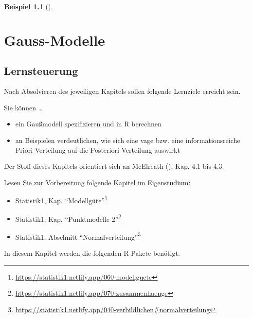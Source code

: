 \documentclass[
  ngerman,
  letterpaper,
  twoside,
  open=any]{scrbook}
\providecommand{\tightlist}{%
  \setlength{\itemsep}{0pt}\setlength{\parskip}{0pt}}\usepackage{longtable,booktabs,array}
\theoremstyle{definition}
\newtheorem{example}{Beispiel}[chapter]
\theoremstyle{plain}
\theoremstyle{definition}
\theoremstyle{definition}
\theoremstyle{remark}
\begin{document}
\begin{example}[]
\chapter{Gauss-Modelle}\label{gauss-modelle}

\section{Lernsteuerung}\label{lernsteuerung-7}

Nach Absolvieren des jeweiligen Kapitels sollen folgende Lernziele
erreicht sein.

Sie können \ldots{}

\begin{itemize}
\tightlist
\item
  ein Gaußmodell spezifizieren und in R berechnen
\item
  an Beispielen verdeutlichen, wie sich eine vage bzw. eine
  informationsreiche Priori-Verteilung auf die Posteriori-Verteilung
  auswirkt
\end{itemize}

Der Stoff dieses Kapitels orientiert sich an McElreath
(), Kap. 4.1 bis 4.3.

Lesen Sie zur Vorbereitung folgende Kapitel im Eigenstudium:

\begin{itemize}
\tightlist
\item
  \href{https://statistik1.netlify.app/060-modellguete}{Statistik1, Kap.
  \enquote{Modellgüte}}\footnote{\url{https://statistik1.netlify.app/060-modellguete}}
\item
  \href{https://statistik1.netlify.app/070-zusammenhaenge}{Statistik1,
  Kap. \enquote{Punktmodelle 2}}\footnote{\url{https://statistik1.netlify.app/070-zusammenhaenge}}
\item
  \href{https://statistik1.netlify.app/040-verbildlichen\#normalverteilung}{Statistik1,
  Abschnitt \enquote{Normalverteilung}}\footnote{\url{https://statistik1.netlify.app/040-verbildlichen\#normalverteilung}}
\end{itemize}

In diesem Kapitel werden die folgenden R-Pakete benötigt.

\begin{tcolorbox}[enhanced jigsaw, arc=.35mm, bottomrule=.15mm, bottomtitle=1mm, breakable, colback=white, colbacktitle=quarto-callout-note-color!10!white, colframe=quarto-callout-note-color-frame, coltitle=black, left=2mm, leftrule=.75mm, opacityback=0, opacitybacktitle=0.6, rightrule=.15mm, title=\textcolor{quarto-callout-note-color}{\faInfo}\hspace{0.5em}{Hinweis}, titlerule=0mm, toprule=.15mm, toptitle=1mm]


\end{tcolorbox}
\end{example}
\end{document}
